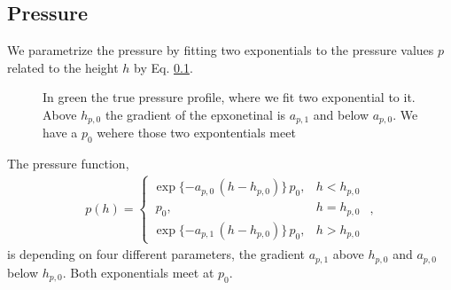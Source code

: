 \subsection{Pressure}
We parametrize the pressure by fitting two exponentials to the pressure values $p$ related to the height $h$ by Eq. \ref{}.
\begin{figure}[ht!]
	\centering
	\caption{In green the true pressure profile, where we fit two exponential to it.
		Above $h_{p,0}$ the gradient of the epxonetinal is $a_{p,1}$ and below $a_{p,0}$.
		We have a $p_0$ wehere those two expontentials meet}
	\label{fig:nter-label}
\end{figure}
The pressure function,
\begin{align}
	p(h) = \begin{cases*}
		\exp{ \{ -a_{p,0} \,  (h - h_{p,0} ) \} } \,  p_0, & \text{$h < h_{p,0}$}\\\
		p_0,  & \text{$h = h_{p,0}$}\\
		\exp{ \{ -  a_{p,1} \, (h - h_{p,0} )  \} \, p_0}, & \text{$h > h_{p,0}$}\
	\end{cases*} \, ,
\end{align}
is depending on four different parameters, the gradient $a_{p,1}$ above $h_{p,0}$ and $a_{p,0}$ below $h_{p,0}$.
Both exponentials meet at $p_0$.


